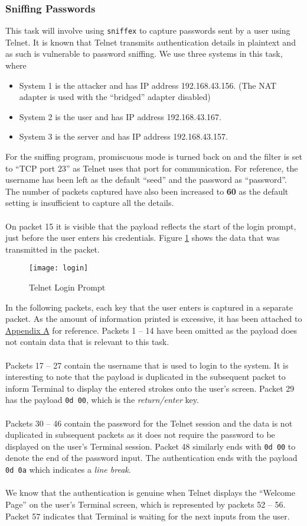\documentclass[a4paper,12pt]{article}
\begin{document}
\subsubsection{Sniffing Passwords}
\noindent This task will involve using \texttt{sniffex} to capture passwords sent by a user using Telnet. It is known that Telnet transmits authentication details in plaintext and as such is vulnerable to password sniffing. We use three systems in this task, where
\begin{itemize}
\item System 1 is the attacker and has IP address 192.168.43.156. (The NAT adapter is used with the ``bridged'' adapter disabled)
\item System 2 is the user and has IP address 192.168.43.167.
\item System 3 is the server and has IP address 192.168.43.157.
\end{itemize}
For the sniffing program, promiscuous mode is turned back on and the filter is set to ``TCP port 23'' as Telnet uses that port for communication. For reference, the username has been left as the default ``seed'' and the password as ``password''. The number of packets captured have also been increased to \textbf{60} as the default setting is insufficient to capture all the details.\\\\ On packet 15 it is visible that the payload reflects the start of the login prompt, just before the user enters his credentials. Figure \ref{fig:login} shows the data that was transmitted in the packet.
\begin{figure}[H]
\centering
\texttt{[image: login]}
\caption{Telnet Login Prompt}
\label{fig:login}
\end{figure}
\noindent In the following packets, each key that the user enters is captured in a separate packet. As the amount of information printed is excessive, it has been attached to \hyperref[ch:AppA]{Appendix A} for reference. Packets 1 -- 14 have been omitted as the payload does not contain data that is relevant to this task.\\\\
Packets 17 -- 27 contain the username that is used to login to the system. It is interesting to note that the payload is duplicated in the subsequent packet to inform Terminal to display the entered strokes onto the user's screen. Packet 29 has the payload \texttt{0d 00}, which is the \textit{return/enter} key.\\\\Packets 30 -- 46 contain the password for the Telnet session and the data is not duplicated in subsequent packets as it does not require the password to be displayed on the user's Terminal session. Packet 48 similarly ends with \texttt{0d 00} to denote the end of the password input. The authentication ends with the payload \texttt{0d 0a} which indicates a \textit{line break}.\\\\We know that the authentication is genuine when Telnet displays the ``Welcome Page'' on the user's Terminal screen, which is represented by packets 52 -- 56. Packet 57 indicates that Terminal is waiting for the next inputs from the user.
\end{document}
